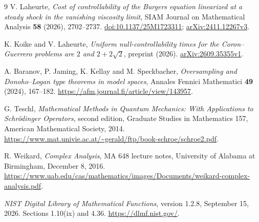 \documentclass[11pt]{article}
\numberwithin{equation}{section}
\begin{document}
\begin{thebibliography}{9}
V. Laheurte,
\emph{Cost of controllability of the Burgers equation linearized at a
steady shock in the vanishing viscosity limit},
SIAM Journal on Mathematical Analysis \textbf{58} (2026), 2702--2737.
\href{https://doi.org/10.1137/25M1723311}{doi:10.1137/25M1723311};
\href{https://arxiv.org/abs/2411.12267v3}{arXiv:2411.12267v3}.

K. Koike and V. Laheurte,
\emph{Uniform null-controllability times for the Coron--Guerrero
problems are $2$ and $2+2\sqrt2$},
preprint (2026).
\href{https://arxiv.org/abs/2609.35355v1}{arXiv:2609.35355v1}.

A. Baranov, P. Jaming, K. Kellay and M. Speckbacher,
\emph{Oversampling and Donoho--Logan type theorems in model spaces},
Annales Fennici Mathematici \textbf{49} (2024), 167--182.
\url{https://afm.journal.fi/article/view/143957}.

G. Teschl,
\emph{Mathematical Methods in Quantum Mechanics:
With Applications to Schr\"odinger Operators},
second edition, Graduate Studies in Mathematics 157,
American Mathematical Society, 2014.
\url{https://www.mat.univie.ac.at/~gerald/ftp/book-schroe/schroe2.pdf}.

R. Weikard, \emph{Complex Analysis}, MA 648 lecture notes,
University of Alabama at Birmingham, December 8, 2016.
\url{https://www.uab.edu/cas/mathematics/images/Documents/weikard-complex-analysis.pdf}.

\emph{NIST Digital Library of Mathematical Functions},
version 1.2.8, September 15, 2026.
Sections 1.10(ix) and 4.36.
\url{https://dlmf.nist.gov/}.
\end{thebibliography}
\end{document}
